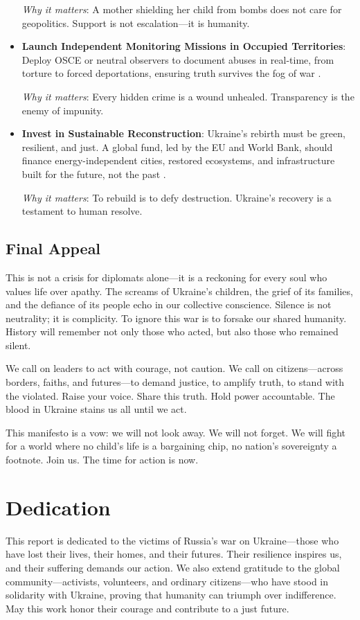 \documentclass[a4paper,12pt]{article}
\begin{document}
\begin{itemize}
    \textit{Why it matters}: A mother shielding her child from bombs does not care for geopolitics. Support is not escalation—it is humanity.

    \item \textbf{Launch Independent Monitoring Missions in Occupied Territories}: Deploy OSCE or neutral observers to document abuses in real-time, from torture to forced deportations, ensuring truth survives the fog of war \cite{osce_2023}.
    
    \textit{Why it matters}: Every hidden crime is a wound unhealed. Transparency is the enemy of impunity.

    \item \textbf{Invest in Sustainable Reconstruction}: Ukraine’s rebirth must be green, resilient, and just. A global fund, led by the EU and World Bank, should finance energy-independent cities, restored ecosystems, and infrastructure built for the future, not the past \cite{world_bank_2023, eco_impact_2023}.
    
    \textit{Why it matters}: To rebuild is to defy destruction. Ukraine’s recovery is a testament to human resolve.
\end{itemize}

\subsection*{Final Appeal}
This is not a crisis for diplomats alone—it is a reckoning for every soul who values life over apathy. The screams of Ukraine’s children, the grief of its families, and the defiance of its people echo in our collective conscience. Silence is not neutrality; it is complicity. To ignore this war is to forsake our shared humanity. History will remember not only those who acted, but also those who remained silent.

We call on leaders to act with courage, not caution. We call on citizens—across borders, faiths, and futures—to demand justice, to amplify truth, to stand with the violated. Raise your voice. Share this truth. Hold power accountable. The blood in Ukraine stains us all until we act.

This manifesto is a vow: we will not look away. We will not forget. We will fight for a world where no child’s life is a bargaining chip, no nation’s sovereignty a footnote. Join us. The time for action is now.

\section{Dedication}
This report is dedicated to the victims of Russia’s war on Ukraine—those who have lost their lives, their homes, and their futures. Their resilience inspires us, and their suffering demands our action. We also extend gratitude to the global community—activists, volunteers, and ordinary citizens—who have stood in solidarity with Ukraine, proving that humanity can triumph over indifference. May this work honor their courage and contribute to a just future.

\printbibliography
\end{document}
